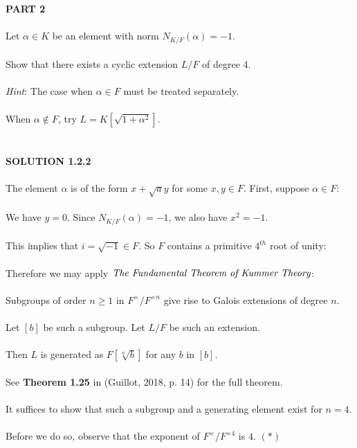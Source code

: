 \documentclass{article}
\begin{document}
\noindent \textbf{PART 2} \\\\
\indent Let $\alpha \in K$ be an element with norm $N_{K/F}(\alpha) = -1$. \\\\
\indent Show that there exists a cyclic extension $L/F$ of degree 4. \\\\
\indent \emph{Hint}: The case when $\alpha \in F$ must be treated separately. \\\\
\indent When $\alpha \notin F$, try $L = K[\sqrt{1+\alpha^2}]$. \\\\
\\
\textbf{SOLUTION 1.2.2} \\\\
\noindent The element $\alpha$ is of the form $x + \sqrt{a} y$ for some $x, y \in F$. First, suppose $\alpha \in F$: \\\\
We have $y = 0$. Since $N_{K/F}(\alpha) = -1$, we also have $x^2 = -1$. \\\\
This implies that $i = \sqrt{-1} \in F$. So $F$ contains a primitive $4^{th}$ root of unity: \\\\
Therefore we may apply $\emph{The Fundamental Theorem of Kummer Theory}$: \\\\ 
\indent Subgroups of order $n \geq 1$ in $F^\times/F^{\times n}$ give rise to Galois extensions of degree $n$. \\\\
\indent Let $[b]$ be such a subgroup. Let $L/F$ be such an extension. \\\\
\indent Then $L$ is generated as $F[\sqrt[n]{b}]$ for any $b$ in $[b]$. \\\\
\indent See \textbf{Theorem 1.25} in (Guillot, 2018, p. 14) for the full theorem. \\\\
It suffices to show that such a subgroup and a generating element exist for $n = 4$. \\\\
Before we do so, observe that the exponent of $F^\times/F^{\times4}$ is $4$. $(\ast)$ \\\\
\end{document}
